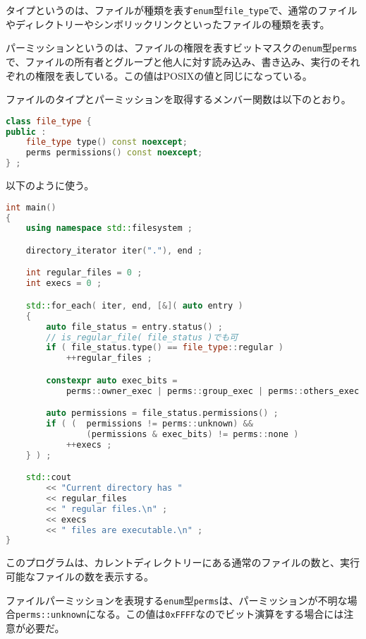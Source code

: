 タイプというのは、ファイルが種類を表す\lstinline!enum!型\lstinline!file_type!で、通常のファイルやディレクトリーやシンボリックリンクといったファイルの種類を表す。

パーミッションというのは、ファイルの権限を表すビットマスクの\lstinline!enum!型\lstinline!perms!で、ファイルの所有者とグループと他人に対す読み込み、書き込み、実行のそれぞれの権限を表している。この値はPOSIXの値と同じになっている。

ファイルのタイプとパーミッションを取得するメンバー関数は以下のとおり。

\begin{lstlisting}[language=C++]
class file_type {
public :
    file_type type() const noexcept;
    perms permissions() const noexcept;
} ;
\end{lstlisting}

以下のように使う。

\begin{lstlisting}[language=C++]
int main()
{
    using namespace std::filesystem ;

    directory_iterator iter("."), end ;

    int regular_files = 0 ;
    int execs = 0 ;

    std::for_each( iter, end, [&]( auto entry )
    {
        auto file_status = entry.status() ;
        // is_regular_file( file_status )でも可
        if ( file_status.type() == file_type::regular )
            ++regular_files ;

        constexpr auto exec_bits = 
            perms::owner_exec | perms::group_exec | perms::others_exec ;

        auto permissions = file_status.permissions() ;
        if ( (  permissions != perms::unknown) &&
                (permissions & exec_bits) != perms::none ) 
            ++execs ;
    } ) ;

    std::cout
        << "Current directory has "
        << regular_files
        << " regular files.\n" ;
        << execs
        << " files are executable.\n" ;
}
\end{lstlisting}

このプログラムは、カレントディレクトリーにある通常のファイルの数と、実行可能なファイルの数を表示する。

ファイルパーミッションを表現する\lstinline!enum!型\lstinline!perms!は、パーミッションが不明な場合\lstinline!perms::unknown!になる。この値は\lstinline!0xFFFF!なのでビット演算をする場合には注意が必要だ。

